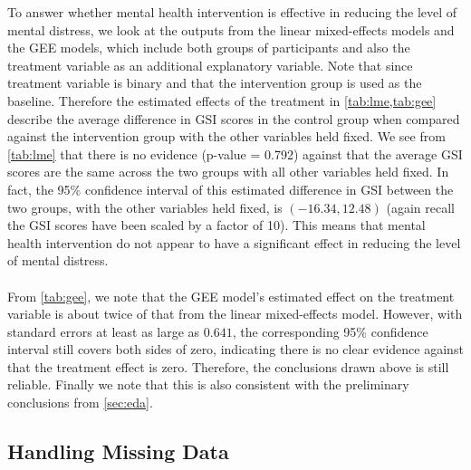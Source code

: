 \noindent\noindent To answer whether mental health intervention is effective in reducing the level of mental distress, we look at the outputs from the linear mixed-effects models and the GEE models, which include both groups of participants and also the treatment variable as an additional explanatory variable. Note that since treatment variable is binary and that the intervention group is used as the baseline. Therefore the estimated effects of the treatment in \cref{tab:lme,tab:gee} describe the average difference in GSI scores in the control group when compared against the intervention group with the other variables held fixed. We see from \cref{tab:lme} that there is no evidence (p-value = 0.792) against that the average GSI scores are the same across the two groups with all other variables held fixed. In fact, the 95\% confidence interval of this estimated difference in GSI between the two groups, with the other variables held fixed, is $(-16.34, 12.48)$ (again recall the GSI scores have been scaled by a factor of 10). This means that mental health intervention do not appear to have a significant effect in reducing the level of mental distress.\\\\
From \cref{tab:gee}, we note that the GEE model's estimated effect on the treatment variable is about twice of that from the linear mixed-effects model. However, with standard errors at least as large as $0.641$, the corresponding 95\% confidence interval still covers both sides of zero, indicating there is no clear evidence against that the treatment effect is zero. Therefore, the conclusions drawn above is still reliable. Finally we note that this is also consistent with the preliminary conclusions from \cref{sec:eda}.
\subsection{Handling Missing Data} \label{sec:handling.missing.data}

\cite{little2019statistical}